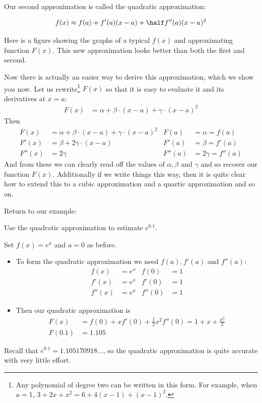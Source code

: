 Our second approximation is called the quadratic approximation:
\begin{impeqn}\label{eq:quadApprox}
\begin{align*}
f(x)\approx f(a)+f'(a)(x-a)+\half f''(a)(x-a)^2
\end{align*}
\end{impeqn}
\noindent Here is a figure showing the graphs
of a typical $f(x)$ and approximating function $F(x)$.
This new approximation looks better than both the first and second.


Now there is actually an easier way to derive this approximation, which we show
you now. Let us rewrite\footnote{Any polynomial of degree two can be written in
this form. For example, when $a=1$, $3 + 2x + x^2 =   6 +  4(x-1) + (x-1)^2$.}
$F(x)$ so that it is easy to evaluate it and its derivatives at $x=a$:
\begin{align*}
  F(x) &= \alpha + \beta\cdot (x-a) + \gamma \cdot(x-a)^2
\end{align*}
Then
\begin{align*}
  F(x) &= \alpha + \beta\cdot (x-a) + \gamma \cdot(x-a)^2 &
  F(a) &= \alpha = f(a) \\
  F'(x) &= \beta + 2\gamma \cdot(x-a) &
  F'(a)&=\beta = f'(a) \\
  F''(x) &= 2\gamma &
  F''(a) &= 2\gamma = f''(a)
\end{align*}
And from these we can clearly read off the values of $\alpha,\beta$ and $\gamma$ and so
recover our function $F(x)$. Additionally if we write things this way, then it is quite
clear how to extend this to a cubic approximation and a quartic approximation and so
on.

Return to our example:
\begin{eg}\label{eg_3_4_3}
 Use the quadratic approximation to estimate $e^{0.1}$.

\soln Set $f(x) = e^x$ and $a=0$ as before.
\begin{itemize}
 \item To form the quadratic approximation we need $f(a), f'(a)$ and $f''(a)$:
\begin{align*}
  f(x) &= e^x & f(0) & = 1 \\
  f'(x) &= e^x & f'(0) & = 1\\
  f''(x) &= e^x & f''(0) & = 1
\end{align*}
\item Then our quadratic approximation is
\begin{align*}
  F(x) &= f(0) + x f'(0)  + \frac{1}{2} x^2 f''(0) = 1 + x + \frac{x^2}{2} \\
  F(0.1) &= 1.105
\end{align*}
\end{itemize}
Recall that $e^{0.1} = 1.105170918\dots$, so the quadratic approximation is quite
accurate with very little effort.
\end{eg}




